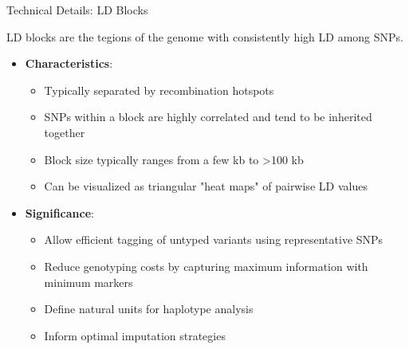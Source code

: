 \begin{frame}{Technical Details: LD Blocks}

LD blocks are the tegions of the genome with consistently high LD among SNPs.

\begin{itemize}
\item \textbf{Characteristics}:
\begin{itemize}
\item Typically separated by recombination hotspots
\item SNPs within a block are highly correlated and tend to be inherited together
\item Block size typically ranges from a few kb to >100 kb
\item Can be visualized as triangular "heat maps" of pairwise LD values
\end{itemize}
\end{itemize}

\begin{itemize}
\item \textbf{Significance}:
\begin{itemize}
\item Allow efficient tagging of untyped variants using representative SNPs
\item Reduce genotyping costs by capturing maximum information with minimum markers
\item Define natural units for haplotype analysis
\item Inform optimal imputation strategies
\end{itemize}
\end{itemize}

\end{frame}

